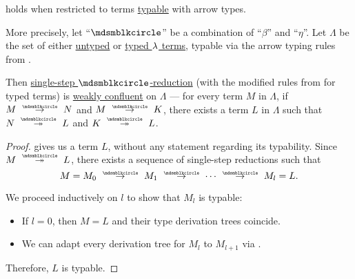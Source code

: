 \begin{proposition}\label{thm:simply_typed_church_rosser_theorem}
   holds when restricted to terms \hyperref[def:typability]{typable} with arrow types.

  More precisely, let \enquote{\( {\Anon} \)} be a combination of \enquote{\( \beta \)} and \enquote{\( \eta \)}. Let \( \Lambda \) be the set of either \hyperref[def:lambda_term]{untyped} or \hyperref[def:typed_lambda_term]{typed \( {\mathrm \lambda} \) terms}, typable via the arrow typing rules from .

  Then \hyperref[def:lambda_term_reduction/single]{single-step \( \Anon \)-reduction} (with the modified rules from  for typed terms) is \hyperref[def:reduction_confluence]{weakly confluent} on \( \Lambda \) --- for every term \( M \) in \( \Lambda \), if \( M \pred N \) and \( M \pred K \), there exists a term \( L \) in \( \Lambda \) such that \( N \pred* L \) and \( K \pred* L \).
\end{proposition}
\begin{proof}
   gives us a term \( L \), without any statement regarding its typability. Since \( M \pred* L \), there exists a sequence of single-step reductions such that
  \begin{equation*}
    M = M_0 \pred M_1 \pred \cdots \pred M_l = L.
  \end{equation*}

  We proceed inductively on \( l \) to show that \( M_l \) is typable:
  \begin{itemize}
    \item If \( l = 0 \), then \( M = L \) and their type derivation trees coincide.
    \item We can adapt every derivation tree for \( M_l \) to \( M_{l+1} \) via .
  \end{itemize}

  Therefore, \( L \) is typable.
\end{proof}
